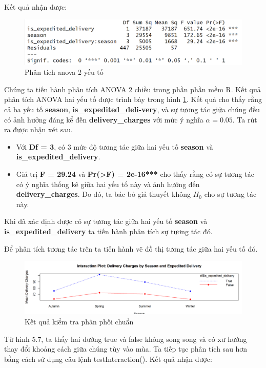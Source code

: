 Kết quả nhận được: 
\begin{figure}[!htbp]
    \centering
    \includegraphics[width=1\linewidth]{graphics/5.4.4.png}
    \caption{Phân tích anova 2 yếu tố}
    \label{fig:5.6}
\end{figure}

Chúng ta tiến hành phân tích ANOVA 2 chiều trong phần phần mềm R. Kết quả phân tích ANOVA hai yếu tố được trình bày trong hình \ref{fig:5.6}. Kết quả cho thấy rằng cả ba yếu tố \textbf{season}, \textbf{is\_expedited\_deli-very}, và sự tương tác giữa chúng đều có ảnh hưởng đáng kể đến \textbf{delivery\_charges} với mức ý nghĩa $\alpha = 0.05$. Ta rút ra được nhận xét sau.
\begin{itemize}
    \item Với \textbf{Df = 3}, có 3 mức độ tương tác giữa hai yếu tố \textbf{season} và \textbf{is\_expedited\_delivery}.
    \item Giá trị \textbf{F = 29.24} và \textbf{Pr(>F) = 2e-16***} cho thấy rằng có sự tương tác có ý nghĩa thống kê giữa hai yếu tố này và ảnh hưởng đến \textbf{delivery\_charges}. Do đó, ta bác bỏ giả thuyết không \(H_0\) cho sự tương tác này.
\end{itemize}
 Khi đã xác định được có sự tương tác giữa hai yếu tố \textbf{season} và \textbf{is\_expedited\_delivery} ta tiến hành phân tích sự tương tác đó. 

Để phân tích tương tác trên ta tiến hành vẽ đồ thị tương tác giữa hai yếu tố đó.

\begin{figure}[!htbp]
    \centering
    \includegraphics[width=0.7\linewidth]{graphics/5.7.1.1.png}
    \caption{Kết quả kiểm tra phân phối chuẩn}
\end{figure}

Từ hình 5.7, ta thấy hai đường true và false không song song và có xư hướng thay đổi khoảng cách giữa chúng tùy vào mùa.
Ta tiếp tục phân tích sau hơn bằng cách sử dụng câu lệnh testInteraction().
Kết quả nhận được:

